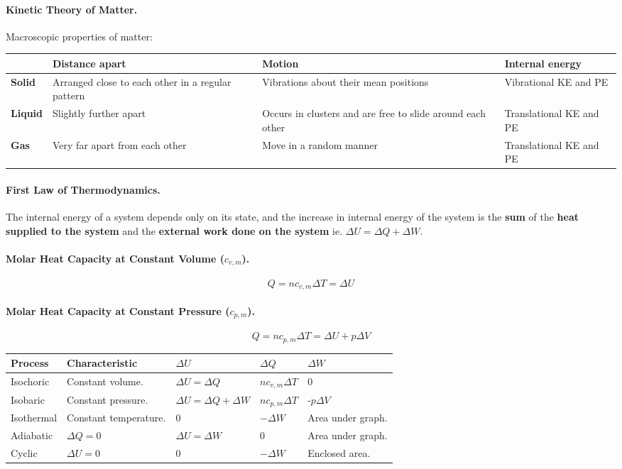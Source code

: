 \documentclass{article}
\begin{document}
\paragraph{Kinetic Theory of Matter.} Macroscopic properties of matter:

\begin{tabular}{|l|p{5cm}|p{5cm}|p{5cm}|}
\hline
& \textbf{Distance apart} & \textbf{Motion} & \textbf{Internal energy} \\
\hline
\textbf{Solid} & Arranged close to each other in a regular pattern & Vibrations about their mean positions & Vibrational KE and PE \\
\textbf{Liquid} & Slightly further apart & Occurs in clusters and are free to slide around each other & Translational KE and PE \\
\textbf{Gas} & Very far apart from each other & Move in a random manner & Translational KE and PE \\
\hline
\end{tabular}

\paragraph{First Law of Thermodynamics.} The internal energy of a system depends only on its state, and the increase in internal energy of the system is the \textbf{sum} of the \textbf{heat supplied to the system} and the \textbf{external work done on the system} ie. $\Delta U = \Delta Q + \Delta W$.

\paragraph{Molar Heat Capacity at Constant Volume ($c_{v,m}$).} \begin{equation}
Q = nc_{v,m}\Delta T = \Delta U
\end{equation}

\paragraph{Molar Heat Capacity at Constant Pressure ($c_{p,m}$).} \begin{equation}
Q = nc_{p,m}\Delta T = \Delta U + p\Delta V
\end{equation}

\begin{tabular}{|l|l|l|l|l|}
\hline
\textbf{Process} & \textbf{Characteristic} & $\Delta U$ & $\Delta Q$ & $\Delta W$ \\
\hline
Isochoric & Constant volume. & $\Delta U = \Delta Q$ & $nc_{v,m}\Delta T$ & 0 \\
Isobaric & Constant pressure. & $\Delta U = \Delta Q + \Delta W$ & $nc_{p,m}\Delta T$ & -$p\Delta V$ \\
Isothermal & Constant temperature. & 0 & $-\Delta W$ & Area under graph. \\
Adiabatic & $\Delta Q = 0$ & $\Delta U = \Delta W$ & 0 & Area under graph. \\
Cyclic & $\Delta U = 0$ & 0 & $-\Delta W$ & Enclosed area. \\
\hline
\end{tabular}
\end{document}
